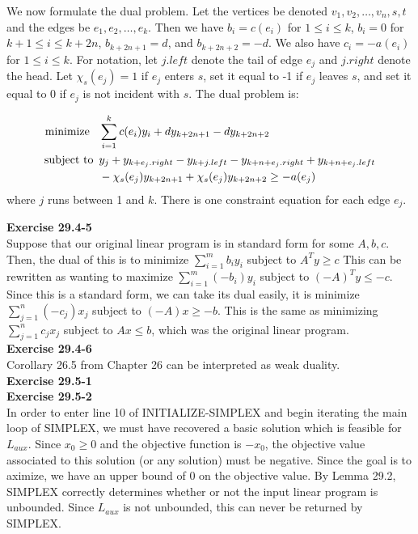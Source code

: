 \documentclass{article}
\begin{document}
We now formulate the dual problem.  Let the vertices be denoted $v_1, v_2, \ldots, v_n, s, t$ and the edges be $e_1, e_2, \ldots, e_k$.  Then we have $b_i = c(e_i)$ for $1 \leq i \leq k$, $b_i = 0$ for $k+1 \leq i \leq k+2n$, $b_{k+2n+1} = d$, and $b_{k+2n+2} = -d$. We also have $c_i = -a(e_i)$ for $1 \leq i \leq k$.  For notation, let $j.left$ denote the tail of edge $e_j$ and $j.right$ denote the head.  Let $\chi_s(e_j) = 1$ if $e_j$ enters $s$, set it equal to -1 if $e_j$ leaves $s$, and set it equal to $0$ if $e_j$ is not incident with $s$.  The dual problem is:

\begin{align*}
\mbox{minimize \,\,\,} & \sum_{i=1}^k c(e_i)y_i + dy_{k+2n+1} - dy_{k+2n+2}\\
\mbox{subject to \,} & y_j + y_{k+e_j.right} - y_{k+j.left} - y_{k+n+e_j.right} + y_{k + n + e_j.left} \\
& - \chi_s(e_j)y_{k+2n+1} + \chi_s(e_j) y_{k+2n+2} \geq -a(e_j)
\end{align*}
where $j$ runs between 1 and $k$.  There is one constraint equation for each edge $e_j$. 


\noindent\textbf{Exercise 29.4-5}\\

Suppose that our original linear program is in standard form for some $A,b,c$. Then, the dual of this is to minimize $\sum_{i=1}^m b_i y_i$ subject to $A^T y \ge c$ This can be rewritten as wanting to maximize $\sum_{i=1}^m (-b_i) y_i$ subject to $(-A)^T y \le -c$. Since this is a standard form, we can take its dual easily, it is minimize $\sum_{j=1}^n (-c_j) x_j$ subject to $(-A)x \ge -b$. This is the same as minimizing $\sum_{j=1}^n c_j x_j$ subject to $Ax \le b$, which was the original linear program.\\

\noindent\textbf{Exercise 29.4-6}\\

Corollary 26.5 from Chapter 26 can be interpreted as weak duality. \\

\noindent\textbf{Exercise 29.5-1}\\

\noindent\textbf{Exercise 29.5-2}\\

In order to enter line 10 of INITIALIZE-SIMPLEX and begin iterating the main loop of SIMPLEX, we must have recovered a basic solution which is feasible for $L_{aux}$. Since $x_0 \geq 0$ and the objective function is $-x_0$, the objective value associated to this solution (or any solution) must be negative. Since the goal is to aximize, we have an upper bound of 0 on the objective value. By Lemma 29.2, SIMPLEX correctly determines whether or not the input linear program is unbounded.  Since $L_{aux}$ is not unbounded, this can never be returned by SIMPLEX. \\
\end{document}
